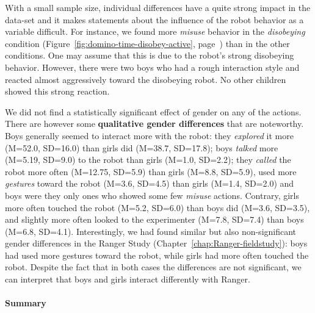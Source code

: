 \documentclass{sig-alternate}
\begin{document}
With a small sample size, individual differences have a quite strong impact in
the data-set and it makes statements about the influence of the robot behavior
as a variable difficult. For instance, we found more \textit{misuse} behavior in
the \textit{disobeying} condition (Figure~\ref{fig:domino-time-disobey-active},
page~\pageref{fig:domino-time-disobey-active}) than in the other conditions. One
may assume that this is due to the robot's strong disobeying behavior. However,
there were two boys who had a rough interaction style and reacted almost
aggressively toward the disobeying robot. No other children showed this strong
reaction.

We did not find a statistically significant effect of gender on any of the
actions. There are however some \textbf{qualitative gender differences} that are
noteworthy. Boys generally seemed to interact more with the robot: they
\textit{explored} it more (M=52.0, SD=16.0) than girls did (M=38.7, SD=17.8);
boys \textit{talked} more (M=5.19, SD=9.0) to the robot than girls (M=1.0,
SD=2.2); they \textit{called} the robot more often (M=12.75, SD=5.9) than girls
(M=8.8, SD=5.9), used more \textit{gestures} toward the robot (M=3.6, SD=4.5)
than girls (M=1.4, SD=2.0) and boys were they only ones who showed some few
\textit{misuse} actions. Contrary, girls more often touched the robot (M=5.2,
SD=6.0) than boys did (M=3.6, SD=3.5), and slightly more often looked to the
experimenter (M=7.8, SD=7.4) than boys (M=6.8, SD=4.1). Interestingly, we had
found similar but also non-significant gender differences in the Ranger Study
(Chapter~\ref{chap:Ranger-fieldstudy}): boys had used more gestures toward the
robot, while girls had more often touched the robot. Despite the fact that in
both cases the differences are not significant, we can interpret that boys and
girls interact differently with Ranger.


\paragraph{Summary}	
\end{document}
